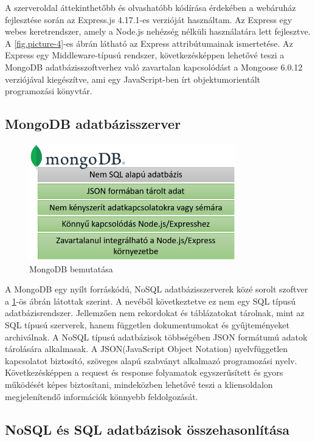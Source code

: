 A szerveroldal áttekinthetőbb és olvashatóbb kódírása érdekében a webáruház fejlesztése során az Express.js 4.17.1-es verzióját használtam. Az Express egy webes keretrendszer, amely a Node.js nehézség nélküli használatára lett fejlesztve. A \ref{fig.picture-4}-es ábrán látható az Express attribútumainak ismertetése. Az Express egy Middleware-típusú rendszer, következésképpen lehetővé teszi a MongoDB adatbázisszoftverhez való zavartalan kapcsolódást a Mongoose\cite{mongoose} 6.0.12 verziójával kiegészítve, ami egy JavaScript-ben írt objektumorientált programozási könyvtár.

\subsection{MongoDB adatbázisszerver}

\begin{figure}[H]
	\centering
	\includegraphics[width=0.8\textwidth]{images/mongodb_bemutatasa.png}
	\caption{MongoDB bemutatása}
	\label{fig.picture-5}
\end{figure}

A MongoDB egy nyílt forráskódú, NoSQL\cite{nosql} adatbázisszerverek közé sorolt szoftver a \ref{fig.picture-5}-ös ábrán látottak szerint. A nevéből következtetve ez nem egy SQL típusú adatbázisrendszer. Jellemzően nem rekordokat és táblázatokat tárolnak, mint az SQL típusú szerverek, hanem független dokumentumokat és gyűjteményeket archiválnak. A NoSQL típusú adatbázisok többségében JSON\cite{json} formátumú adatok tárolására alkalmasak. A JSON(JavaScript Object Notation) nyelvfüggetlen kapcsolatot biztosító, szöveges alapú szabványt alkalmazó programozási nyelv. Következésképpen a request és response folyamatok egyszerűsített és gyors működését képes biztosítani, mindeközben lehetővé teszi a kliensoldalon megjelenítendő információk könnyebb feldolgozását. 
\bigskip

\subsection{NoSQL és SQL adatbázisok összehasonlítása}

